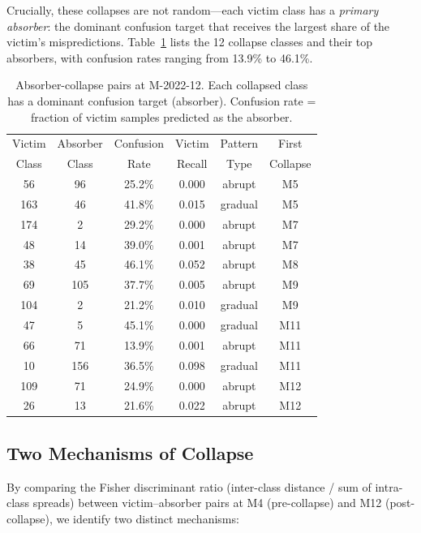 \documentclass[journal]{IEEEtran}
\begin{document}
Crucially, these collapses are not random---each victim class has a \textit{primary absorber}: the dominant confusion target that receives the largest share of the victim's mispredictions.
Table~\ref{tab:absorber_pairs} lists the 12 collapse classes and their top absorbers, with confusion rates ranging from 13.9\% to 46.1\%.

\begin{table}[t]
\centering
\caption{Absorber-collapse pairs at M-2022-12. Each collapsed class has a dominant confusion target (absorber). Confusion rate = fraction of victim samples predicted as the absorber.}
\label{tab:absorber_pairs}
\small
\begin{tabular}{@{}cccccc@{}}
\toprule
Victim & Absorber & Confusion & Victim & Pattern & First \\
Class  & Class    & Rate      & Recall & Type    & Collapse \\
\midrule
56  & 96  & 25.2\% & 0.000 & abrupt  & M5 \\
163 & 46  & 41.8\% & 0.015 & gradual & M5 \\
174 & 2   & 29.2\% & 0.000 & abrupt  & M7 \\
48  & 14  & 39.0\% & 0.001 & abrupt  & M7 \\
38  & 45  & 46.1\% & 0.052 & abrupt  & M8 \\
69  & 105 & 37.7\% & 0.005 & abrupt  & M9 \\
104 & 2   & 21.2\% & 0.010 & gradual & M9 \\
47  & 5   & 45.1\% & 0.000 & gradual & M11 \\
66  & 71  & 13.9\% & 0.001 & abrupt  & M11 \\
10  & 156 & 36.5\% & 0.098 & gradual & M11 \\
109 & 71  & 24.9\% & 0.000 & abrupt  & M12 \\
26  & 13  & 21.6\% & 0.022 & abrupt  & M12 \\
\bottomrule
\end{tabular}
\end{table}

\subsection{Two Mechanisms of Collapse}
\label{sec:mechanisms}

By comparing the Fisher discriminant ratio (inter-class distance / sum of intra-class spreads) between victim--absorber pairs at M4 (pre-collapse) and M12 (post-collapse), we identify two distinct mechanisms:
\end{document}
